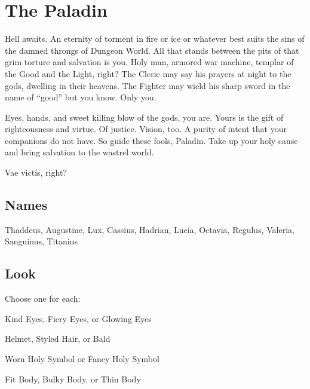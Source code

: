 \chapter{The Paladin}
  
 





Hell awaits. An eternity of torment in fire or ice or whatever best suits the sins of the damned throngs of Dungeon World. All that stands between the pits of that grim torture and salvation is you. Holy man, armored war machine, templar of the Good and the Light, right? The Cleric may say his prayers at night to the gods, dwelling in their heavens. The Fighter may wield his sharp sword in the name of “good” but you know. Only you.

 

Eyes, hands, and sweet killing blow of the gods, you are. Yours is the gift of righteousness and virtue. Of justice. Vision, too. A purity of intent that your companions do not have. So guide these fools, Paladin. Take up your holy cause and bring salvation to the wastrel world.

  

Vae victis, right?



 
\section{Names}   
 



Thaddeus, Augustine, Lux, Cassius, Hadrian, Lucia, Octavia, Regulus, Valeria, Sanguinus, Titanius



 
\section{Look}  
 



Choose one for each:

 

Kind Eyes, Fiery Eyes, or Glowing Eyes

 

Helmet, Styled Hair, or Bald

 

Worn Holy Symbol or Fancy Holy Symbol

 

Fit Body, Bulky Body, or Thin Body



